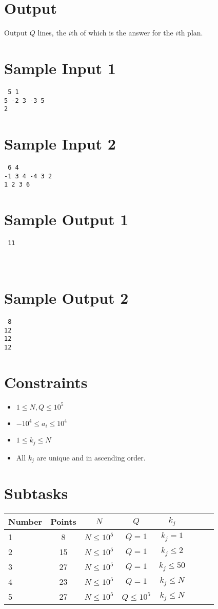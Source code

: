 \documentclass{article}
\begin{document}
\section*{Output}

Output $Q$ lines, the $i$th of which is the answer for the $i$th plan.

\begin{multicols}{2}
\section*{Sample Input 1}
{\tt
5 1\\
5 -2 3 -3 5\\
2
}
\columnbreak
\section*{Sample Input 2}
{\tt
6 4\\
-1 3 4 -4 3 2\\
1 2 3 6
}
\end{multicols}
\begin{multicols}{2}
\section*{Sample Output 1}
{\tt
11\\
\\
\\
}
\columnbreak
\section*{Sample Output 2}
{\tt
8\\
12\\
12\\
12
}
\end{multicols}

\newpage
\section*{Constraints}
\begin{itemize}
\item $1 \le N, Q \le 10^5$
\item $-10^4 \le a_i \le 10^4$
\item $1 \le k_j \le N$
\item All $k_j$ are unique and in ascending order.
\end{itemize}

\section*{Subtasks}
\begin{tabular}{l*{6}{c}r}
Number & Points & $N$ & $Q$ & $k_j$\\
\hline
1 & 8 & $N \le 10^5$ & $Q = 1$ & $k_j = 1$ \\
2 & 15 & $N \le 10^5$ & $Q = 1$ & $k_j \le 2$ \\
3 & 27 & $N \le 10^5$ & $Q = 1$ & $k_j \le 50$ \\
4 & 23 & $N \le 10^5$ & $Q = 1$ & $k_j \le N$ \\
5 & 27 & $N \le 10^5$ & $Q \le 10^5$ & $k_j \le N$
\end{tabular}
\end{document}
